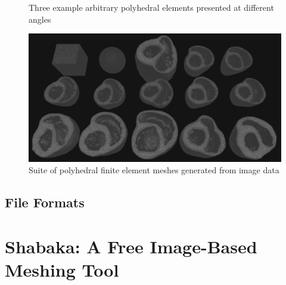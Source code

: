 \begin{figure}[ht]
{\label{fig:zoom5}}		

\caption{Three example arbitrary polyhedral elements presented at different angles}
\label{fig:zoom}
\end{figure}

\begin{figure}[ht]
\centering
\includegraphics[width=1.0\textwidth]{media/3-celeris/7-suite.png}
\caption{Suite of polyhedral finite element meshes generated from image data \vspace{1cm}}
\label{fig:celsuite}
\end{figure}

\subsection{File Formats}
\label{File Formats-MESH}


\section{Shabaka: A Free Image-Based Meshing Tool}